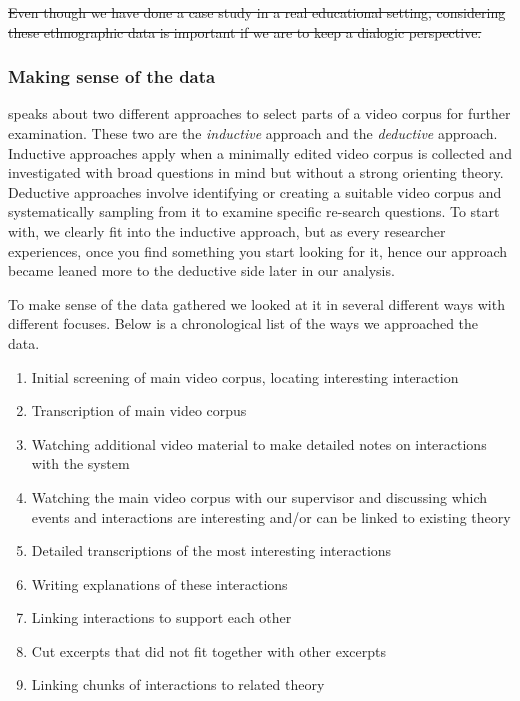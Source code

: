 \sout{Even though we have done a case study in a real educational setting, considering these ethnographic data is important if we are to keep a dialogic perspective.}


\subsubsection{Making sense of the data}
\citeauthor{derry2010conducting} speaks about two different approaches to select parts of a video corpus for further examination. These two are the \emph{inductive} approach and the \emph{deductive} approach. Inductive approaches apply when a minimally edited video corpus is collected and investigated with broad questions in mind but without a strong orienting theory. Deductive approaches involve identifying or creating a suitable video corpus and systematically sampling from it to examine specific re-search questions. \citep{derry2010conducting} To start with, we clearly fit into the inductive approach, but as every researcher experiences, once you find something you start looking for it, hence our approach became leaned more to the deductive side later in our analysis.

To make sense of the data gathered we looked at it in several different ways with different focuses. Below is a chronological list of the ways we approached the data. 


\begin{enumerate}
\item{Initial screening of main video corpus, locating interesting interaction}
\item{Transcription of main video corpus}
\item{Watching additional video material to make detailed notes on interactions with the system}
\item{Watching the main video corpus with our supervisor and discussing which events and interactions are interesting and/or can be linked to existing theory}
\item{Detailed transcriptions of the most interesting interactions}
\item{Writing explanations of these interactions}
\item{Linking interactions to support each other}
\item{Cut excerpts that did not fit together with other excerpts}
\item{Linking chunks of interactions to related theory}
\end{enumerate}

